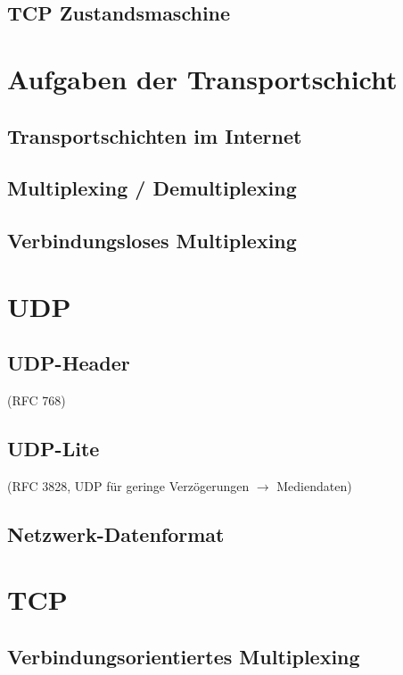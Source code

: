 \subsection{TCP Zustandsmaschine}
\section{Aufgaben der Transportschicht}
\subsection{Transportschichten im Internet}
\subsection{Multiplexing / Demultiplexing}
\subsection{Verbindungsloses Multiplexing}
\section{UDP}
\subsection{UDP-Header}
(RFC 768)
\subsection{UDP-Lite}
(RFC 3828, UDP für geringe Verzögerungen $\to$ Mediendaten)

\subsection{Netzwerk-Datenformat}
\section{TCP}
\subsection{Verbindungsorientiertes Multiplexing}
